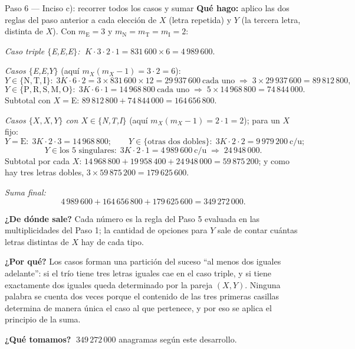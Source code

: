\documentclass[11pt]{article}
\begin{document}
\begin{paso}{Paso 6 --- Inciso c): recorrer todos los casos y sumar}
\textbf{Qué hago:} aplico las dos reglas del paso anterior a cada elección de $X$ (letra repetida) y $Y$
(la tercera letra, distinta de $X$). Con $m_{\text{E}}=3$ y $m_{\text{N}}=m_{\text{T}}=m_{\text{I}}=2$:

\medskip
\emph{Caso triple $\{$E,E,E$\}$:} $\;K\cdot 3\cdot 2\cdot 1=831\,600\times 6=4\,989\,600$.

\medskip
\emph{Casos $\{$E,E,$Y\}$} (aquí $m_X(m_X-1)=3\cdot2=6$):
\[
Y\in\{\text{N},\text{T},\text{I}\}:\;3K\cdot 6\cdot 2=3\times831\,600\times12=29\,937\,600\ \text{cada uno}\;\Rightarrow\;3\times 29\,937\,600=89\,812\,800,
\]
\[
Y\in\{\text{P},\text{R},\text{S},\text{M},\text{O}\}:\;3K\cdot 6\cdot 1=14\,968\,800\ \text{cada uno}\;\Rightarrow\;5\times 14\,968\,800=74\,844\,000 .
\]
Subtotal con $X=$E: $89\,812\,800+74\,844\,000=164\,656\,800$.

\medskip
\emph{Casos $\{X,X,Y\}$ con $X\in\{$N,T,I$\}$} (aquí $m_X(m_X-1)=2\cdot1=2$); para un $X$ fijo:
\[
Y=\text{E}:\;3K\cdot2\cdot3=14\,968\,800;\qquad
Y\in\{\text{otras dos dobles}\}:\;3K\cdot2\cdot2=9\,979\,200\ \text{c/u};
\]
\[
Y\in\text{los 5 singulares}:\;3K\cdot2\cdot1=4\,989\,600\ \text{c/u}\;\Rightarrow\;24\,948\,000 .
\]
Subtotal por cada $X$: $14\,968\,800+19\,958\,400+24\,948\,000=59\,875\,200$; y como hay tres letras
dobles, $3\times 59\,875\,200=179\,625\,600$.

\medskip
\emph{Suma final:}
\[
4\,989\,600+164\,656\,800+179\,625\,600=349\,272\,000 .
\]

\textbf{¿De dónde sale?} Cada número es la regla del Paso 5 evaluada en las multiplicidades del Paso 1; la
cantidad de opciones para $Y$ sale de contar cuántas letras distintas de $X$ hay de cada tipo.

\textbf{¿Por qué?} Los casos forman una partición del suceso ``al menos dos iguales adelante'': si el trío
tiene tres letras iguales cae en el caso triple, y si tiene exactamente dos iguales queda determinado por
la pareja $(X,Y)$. Ninguna palabra se cuenta dos veces porque el contenido de las tres primeras casillas
determina de manera única el caso al que pertenece, y por eso se aplica el principio de la suma.

\textbf{¿Qué tomamos?} $\;349\,272\,000$ anagramas según este desarrollo.
\end{paso}
\end{document}
